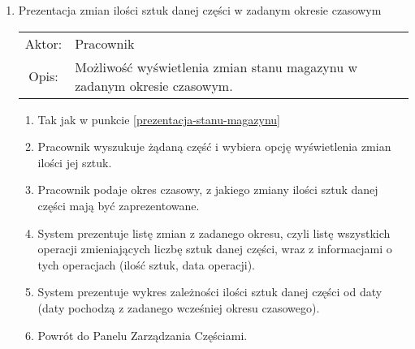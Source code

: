 \begin{enumerate}
  \item Prezentacja zmian ilości sztuk danej części w zadanym okresie czasowym \\
  \begin{tabularx}{\linewidth}{ c X }
  Aktor: & Pracownik \\
  Opis: & Możliwość wyświetlenia zmian stanu magazynu w zadanym okresie czasowym.\\
  \end{tabularx}
   \begin{enumerate}
    \item Tak jak w punkcie \ref{prezentacja-stanu-magazynu}
    \item Pracownik wyszukuje żądaną część i wybiera opcję wyświetlenia zmian ilości jej sztuk.
    \item Pracownik podaje okres czasowy, z jakiego zmiany ilości sztuk danej części mają być zaprezentowane.
    \item System prezentuje listę zmian z zadanego okresu, czyli listę wszystkich operacji zmieniających liczbę sztuk danej części, wraz z informacjami o tych operacjach (ilość sztuk, data operacji).
    \item System prezentuje wykres zależności ilości sztuk danej części od daty (daty pochodzą z zadanego wcześniej okresu czasowego).
    \item Powrót do Panelu Zarządzania Częściami.
  \end{enumerate}
\end{enumerate}